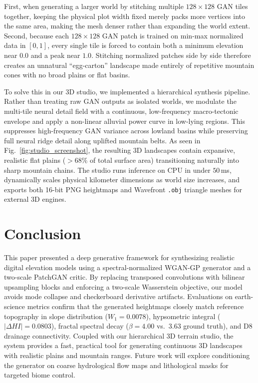 \documentclass[conference]{IEEEtran}
\begin{document}
First, when generating a larger world by stitching multiple $128\times 128$ GAN tiles together, keeping the physical plot width fixed merely packs more vertices into the same area, making the mesh denser rather than expanding the world extent. Second, because each $128\times 128$ GAN patch is trained on min-max normalized data in $[0, 1]$, every single tile is forced to contain both a minimum elevation near $0.0$ and a peak near $1.0$. Stitching normalized patches side by side therefore creates an unnatural ``egg-carton'' landscape made entirely of repetitive mountain cones with no broad plains or flat basins.

To solve this in our 3D studio, we implemented a hierarchical synthesis pipeline. Rather than treating raw GAN outputs as isolated worlds, we modulate the multi-tile neural detail field with a continuous, low-frequency macro-tectonic envelope and apply a non-linear alluvial power curve in low-lying regions. This suppresses high-frequency GAN variance across lowland basins while preserving full neural ridge detail along uplifted mountain belts. As seen in Fig.~\ref{fig:studio_screenshot}, the resulting 3D landscapes contain expansive, realistic flat plains ($>68\%$ of total surface area) transitioning naturally into sharp mountain chains. The studio runs inference on CPU in under $50$\,ms, dynamically scales physical kilometer dimensions as world size increases, and exports both 16-bit PNG heightmaps and Wavefront \texttt{.obj} triangle meshes for external 3D engines.

\section{Conclusion}
This paper presented a deep generative framework for synthesizing realistic digital elevation models using a spectral-normalized WGAN-GP generator and a two-scale PatchGAN critic. By replacing transposed convolutions with bilinear upsampling blocks and enforcing a two-scale Wasserstein objective, our model avoids mode collapse and checkerboard derivative artifacts. Evaluations on earth-science metrics confirm that the generated heightmaps closely match reference topography in slope distribution ($W_1 = 0.0078$), hypsometric integral ($|\Delta HI| = 0.0803$), fractal spectral decay ($\beta = 4.00$ vs.\ $3.63$ ground truth), and D8 drainage connectivity. Coupled with our hierarchical 3D terrain studio, the system provides a fast, practical tool for generating continuous 3D landscapes with realistic plains and mountain ranges. Future work will explore conditioning the generator on coarse hydrological flow maps and lithological masks for targeted biome control.
\end{document}
